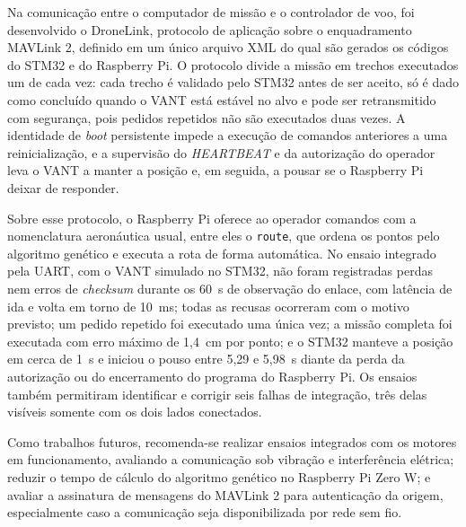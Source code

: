 

Na comunicação entre o computador de missão e o controlador de voo, foi desenvolvido o DroneLink, protocolo de aplicação sobre o enquadramento MAVLink 2, definido em um único arquivo XML do qual são gerados os códigos do STM32 e do Raspberry Pi. O protocolo divide a missão em trechos executados um de cada vez: cada trecho é validado pelo STM32 antes de ser aceito, só é dado como concluído quando o VANT está estável no alvo e pode ser retransmitido com segurança, pois pedidos repetidos não são executados duas vezes. A identidade de \textit{boot} persistente impede a execução de comandos anteriores a uma reinicialização, e a supervisão do \textit{HEARTBEAT} e da autorização do operador leva o VANT a manter a posição e, em seguida, a pousar se o Raspberry Pi deixar de responder.

Sobre esse protocolo, o Raspberry Pi oferece ao operador comandos com a nomenclatura aeronáutica usual, entre eles o \texttt{route}, que ordena os pontos pelo algoritmo genético e executa a rota de forma automática. No ensaio integrado pela UART, com o VANT simulado no STM32, não foram registradas perdas nem erros de \textit{checksum} durante os 60~s de observação do enlace, com latência de ida e volta em torno de 10~ms; todas as recusas ocorreram com o motivo previsto; um pedido repetido foi executado uma única vez; a missão completa foi executada com erro máximo de 1,4~cm por ponto; e o STM32 manteve a posição em cerca de 1~s e iniciou o pouso entre 5,29 e 5,98~s diante da perda da autorização ou do encerramento do programa do Raspberry Pi. Os ensaios também permitiram identificar e corrigir seis falhas de integração, três delas visíveis somente com os dois lados conectados.

Como trabalhos futuros, recomenda-se realizar ensaios integrados com os motores em funcionamento, avaliando a comunicação sob vibração e interferência elétrica; reduzir o tempo de cálculo do algoritmo genético no Raspberry Pi Zero W; e avaliar a assinatura de mensagens do MAVLink 2 para autenticação da origem, especialmente caso a comunicação seja disponibilizada por rede sem fio.
